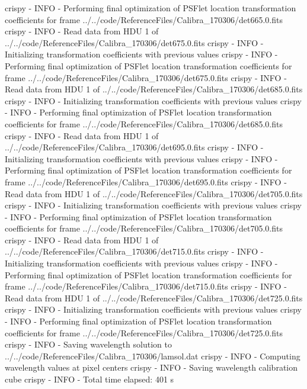 \documentclass[letterpaper,10pt,english]{sphinxmanual}
\begin{document}
\begin{OriginalVerbatim}[commandchars=\\\{\}]
crispy - INFO - Performing final optimization of PSFlet location transformation coefficients for frame ../../code/ReferenceFiles/Calibra_170306/det665.0.fits
crispy - INFO - Read data from HDU 1 of ../../code/ReferenceFiles/Calibra_170306/det675.0.fits
crispy - INFO - Initializing transformation coefficients with previous values
crispy - INFO - Performing final optimization of PSFlet location transformation coefficients for frame ../../code/ReferenceFiles/Calibra_170306/det675.0.fits
crispy - INFO - Read data from HDU 1 of ../../code/ReferenceFiles/Calibra_170306/det685.0.fits
crispy - INFO - Initializing transformation coefficients with previous values
crispy - INFO - Performing final optimization of PSFlet location transformation coefficients for frame ../../code/ReferenceFiles/Calibra_170306/det685.0.fits
crispy - INFO - Read data from HDU 1 of ../../code/ReferenceFiles/Calibra_170306/det695.0.fits
crispy - INFO - Initializing transformation coefficients with previous values
crispy - INFO - Performing final optimization of PSFlet location transformation coefficients for frame ../../code/ReferenceFiles/Calibra_170306/det695.0.fits
crispy - INFO - Read data from HDU 1 of ../../code/ReferenceFiles/Calibra_170306/det705.0.fits
crispy - INFO - Initializing transformation coefficients with previous values
crispy - INFO - Performing final optimization of PSFlet location transformation coefficients for frame ../../code/ReferenceFiles/Calibra_170306/det705.0.fits
crispy - INFO - Read data from HDU 1 of ../../code/ReferenceFiles/Calibra_170306/det715.0.fits
crispy - INFO - Initializing transformation coefficients with previous values
crispy - INFO - Performing final optimization of PSFlet location transformation coefficients for frame ../../code/ReferenceFiles/Calibra_170306/det715.0.fits
crispy - INFO - Read data from HDU 1 of ../../code/ReferenceFiles/Calibra_170306/det725.0.fits
crispy - INFO - Initializing transformation coefficients with previous values
crispy - INFO - Performing final optimization of PSFlet location transformation coefficients for frame ../../code/ReferenceFiles/Calibra_170306/det725.0.fits
crispy - INFO - Saving wavelength solution to ../../code/ReferenceFiles/Calibra_170306/lamsol.dat
crispy - INFO - Computing wavelength values at pixel centers
crispy - INFO - Saving wavelength calibration cube
crispy - INFO - Total time elapsed: 401 s
\end{OriginalVerbatim}
\noindent{}

\noindent{}
\end{document}
